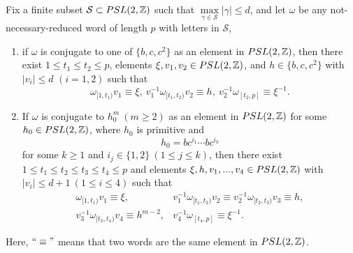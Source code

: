 \documentclass[10pt,a4paper]{amsart}
\begin{document}
    \begin{lemma}\label{l-decom}
        Fix a finite subset $\mathcal{S}\subset\textnormal{PSL}(2,\mathbb{Z})$ such that $\max\limits_{\gamma\in\mathcal{S}}|\gamma|\leq d$, and let $\omega$ be any not-necessary-reduced word of length $p$ with letters in $\mathcal{S}$, 
        \begin{enumerate}
            \item if $\omega$ is conjugate to one of $\{b,c,c^2\}$ as an element in $\textnormal{PSL}(2,\mathbb{Z})$, then there exist $1\leq t_1\leq t_2\leq p$,  elements $\xi,v_1,v_2\in\textnormal{PSL}(2,\mathbb{Z})$, and $h\in\{b,c,c^2\}$ with $|v_i|\leq d$ $(i=1,2)$ such that
            $$\omega_{[1,t_1)}v_1\equiv \xi,\ v_1^{-1}\omega_{[t_1,t_2)}v_2\equiv h,\ v_2^{-1}\omega_{[t_2,p]}\equiv \xi^{-1}.$$
            \item If $\omega$ is conjugate to $h_0^m\ (m\geq 2)$ as an element in $\textnormal{PSL}(2,\mathbb{Z})$ for some $h_0\in\textnormal{PSL}(2,\mathbb{Z})$, where $h_0$ is primitive and 
            $$h_0=bc^{i_1}\cdots bc^{i_k}$$
            for some $k\geq 1$ and $i_j\in\{1,2\}\ (1\leq j\leq k)$,
            then there exist $1\leq t_1\leq t_2\leq t_3\leq t_4\leq p$ and elements $\xi,h,v_1,...,v_4\in\textnormal{PSL}(2,\mathbb{Z})$ with $|v_i|\leq d+1\ (1\leq i\leq 4)$ such that
            $$\begin{matrix}
             \omega_{[1,t_1)}v_1\equiv \xi,& v_1^{-1}\omega_{[t_1,t_2)}v_2\equiv v_2^{-1}\omega_{[t_2,t_3)}v_3\equiv h,\\
                v_3^{-1}\omega_{[t_3,t_4)}v_4\equiv h^{m-2},& v_4^{-1}\omega_{[t_4,p]}\equiv \xi^{-1}.
            \end{matrix}$$
        \end{enumerate}
        Here, $``\equiv"$ means that two words are the same element in $\textnormal{PSL}(2,\mathbb{Z})$.
    \end{lemma}
\end{document}
